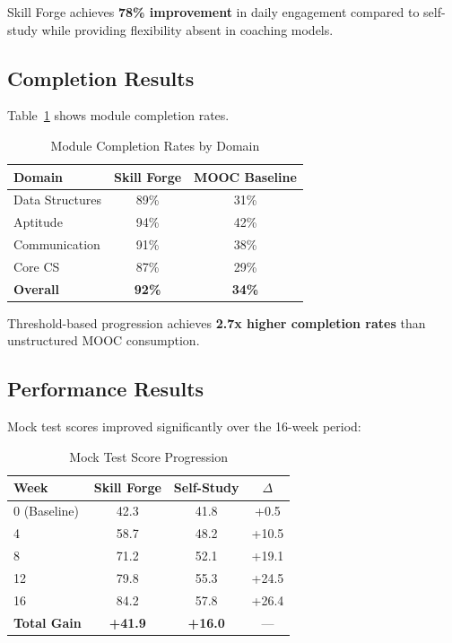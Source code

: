 \documentclass[journal]{IEEEtran}
\begin{document}
Skill Forge achieves \textbf{78\% improvement} in daily engagement compared to self-study while providing flexibility absent in coaching models.

\subsection{Completion Results}

Table~\ref{tab:completion} shows module completion rates.

\begin{table}[htbp]
\caption{Module Completion Rates by Domain}
\label{tab:completion}
\centering
\begin{tabular}{lcc}
\toprule
\textbf{Domain} & \textbf{Skill Forge} & \textbf{MOOC Baseline} \\
\midrule
Data Structures & 89\% & 31\% \\
Aptitude & 94\% & 42\% \\
Communication & 91\% & 38\% \\
Core CS & 87\% & 29\% \\
\midrule
\textbf{Overall} & \textbf{92\%} & \textbf{34\%} \\
\bottomrule
\end{tabular}
\end{table}

Threshold-based progression achieves \textbf{2.7x higher completion rates} than unstructured MOOC consumption.

\subsection{Performance Results}

Mock test scores improved significantly over the 16-week period:

\begin{table}[htbp]
\caption{Mock Test Score Progression}
\centering
\begin{tabular}{lccc}
\toprule
\textbf{Week} & \textbf{Skill Forge} & \textbf{Self-Study} & \textbf{$\Delta$} \\
\midrule
0 (Baseline) & 42.3 & 41.8 & +0.5 \\
4 & 58.7 & 48.2 & +10.5 \\
8 & 71.2 & 52.1 & +19.1 \\
12 & 79.8 & 55.3 & +24.5 \\
16 & 84.2 & 57.8 & +26.4 \\
\midrule
\textbf{Total Gain} & \textbf{+41.9} & \textbf{+16.0} & --- \\
\bottomrule
\end{tabular}
\end{table}
\end{document}

